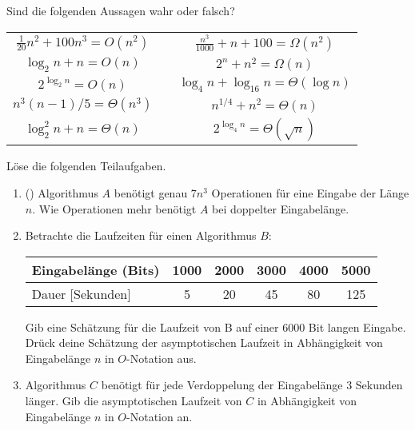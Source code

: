 \documentclass{uebung_cs}
\begin{document}
\begin{aufgabe}
	Sind die folgenden Aussagen wahr oder falsch?
	\begin{center}
		\begin{tabular}{ccc}
			$\frac{1}{20}n^2 + 100 n^3 = O(n^2)$
			&\mbox{}\hspace{2cm}\mbox{}&
			$\frac{n^3}{1000} + n + 100 = \Omega(n^2)$\\
			$\log_2 n + n = O(n)$&&
			$2^n + n^2 = \Omega(n)$\\
			$2^{\log_2 n} = O(n)$&&
			$\log_4 n + \log_{16} n = \Theta(\log n)$\\
			$n^3(n-1)/5 = \Theta(n^3)$&&
			$n^{1/4} + n^2 = \Theta(n)$\\
			$\log_2^2n + n = \Theta(n)$&&
			$2^{\log_4n} = \Theta(\sqrt{n})$
		\end{tabular}
	\end{center}
\end{aufgabe}

\begin{aufgabe}
	Löse die folgenden Teilaufgaben.
	\begin{enumerate}
		\item (\warmup) Algorithmus $A$ benötigt genau $7n^3$ Operationen für eine Eingabe der Länge $n$.
		Wie Operationen mehr benötigt $A$ bei doppelter Eingabelänge.
		\item Betrachte die Laufzeiten für einen Algorithmus $B$:
		\begin{table}[h!]
		\centering
		\begin{tabular}{|l|c|c|c|c|c|}
			\hline
			Eingabelänge (Bits) & 1000 & 2000 & 3000 & 4000 & 5000\\
			\hline
			Dauer [Sekunden] & 5 & 20 & 45 & 80 & 125 \\
			\hline
		\end{tabular}
		\end{table}
		
		Gib eine Schätzung für die Laufzeit von B auf einer 6000 Bit langen Eingabe.
		Drück deine Schätzung der asymptotischen Laufzeit in Abhängigkeit von Eingabelänge $n$ in $O$-Notation aus.
		\item Algorithmus $C$ benötigt für jede Verdoppelung der Eingabelänge 3 Sekunden länger. 
		Gib die asymptotischen Laufzeit von $C$ in Abhängigkeit von Eingabelänge $n$ in $O$-Notation an.
	\end{enumerate}
\end{aufgabe}
\end{document}
